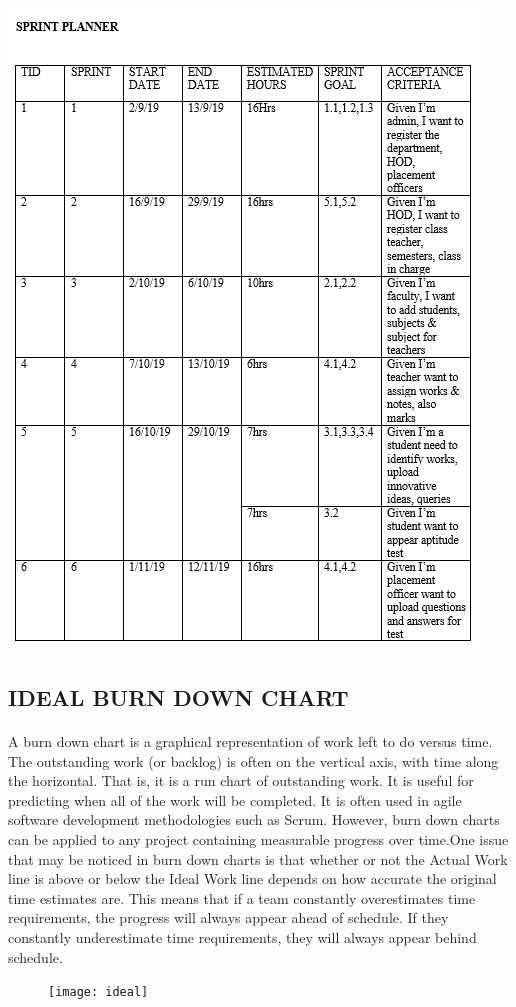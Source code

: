 \documentclass[a4paper, 12pt]{report}
\begin{document}
\includegraphics[scale=1]{sprint} 

\subsection{IDEAL BURN DOWN CHART}

\paragraph{}
A burn down chart is a graphical representation of work left to do versus time. The outstanding work (or backlog) is often on the vertical axis, with time along the horizontal. That is, it is a run chart of outstanding work. It is useful for predicting when all of the work will be completed. It is often used in agile software development methodologies such as Scrum. However, burn down charts can be applied to any project containing measurable progress over time.One issue that may be noticed in burn down charts is that whether or not the Actual Work line is above or below the Ideal Work line depends on how accurate the original time estimates are. This means that if a team constantly overestimates time requirements, the progress will always appear ahead of schedule. If they constantly underestimate time requirements, they will always appear behind schedule.
\begin{figure}[ht]
	\centering
	\texttt{[image: ideal]}
	\label{}
\end{figure}
\end{document}
